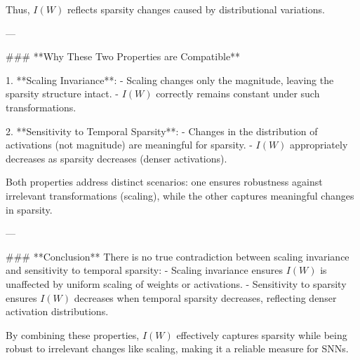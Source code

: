 Thus, \( I(W) \) reflects sparsity changes caused by distributional variations.

---

### **Why These Two Properties are Compatible**

1. **Scaling Invariance**:
   - Scaling changes only the magnitude, leaving the sparsity structure intact.
   - \( I(W) \) correctly remains constant under such transformations.

2. **Sensitivity to Temporal Sparsity**:
   - Changes in the distribution of activations (not magnitude) are meaningful for sparsity.
   - \( I(W) \) appropriately decreases as sparsity decreases (denser activations).

Both properties address distinct scenarios: one ensures robustness against irrelevant transformations (scaling), while the other captures meaningful changes in sparsity.

---

### **Conclusion**
There is no true contradiction between scaling invariance and sensitivity to temporal sparsity:
- Scaling invariance ensures \( I(W) \) is unaffected by uniform scaling of weights or activations.
- Sensitivity to sparsity ensures \( I(W) \) decreases when temporal sparsity decreases, reflecting denser activation distributions.

By combining these properties, \( I(W) \) effectively captures sparsity while being robust to irrelevant changes like scaling, making it a reliable measure for SNNs.